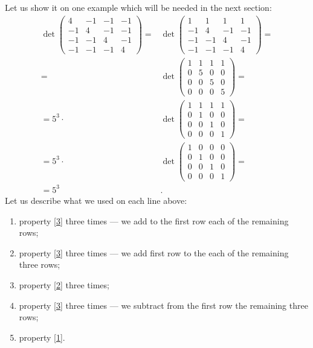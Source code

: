 Let us show it on one example which will be needed in the next section:
\begin{align*}
\det\left(
\begin{matrix}
4&-1&-1&-1
\\
-1&4&-1&-1
\\
-1&-1&4&-1
\\
-1&-1&-1&4
\end{matrix}
\right)
=
&\det\left(
\begin{matrix}
1&1&1&1
\\
-1&4&-1&-1
\\
-1&-1&4&-1
\\
-1&-1&-1&4
\end{matrix}
\right) 
=
\\
=
&\det\left(
\begin{matrix}
1&1&1&1
\\
0&5&0&0
\\
0&0&5&0
\\
0&0&0&5
\end{matrix}
\right)
=
\\
=
5^3\cdot
&\det\left(
\begin{matrix}
1&1&1&1
\\
0&1&0&0
\\
0&0&1&0
\\
0&0&0&1
\end{matrix}
\right)=
\\
=
5^3\cdot&\det\left(
\begin{matrix}
1&0&0&0
\\
0&1&0&0
\\
0&0&1&0
\\
0&0&0&1
\end{matrix}
\right)=
\\
=5^3&.
\end{align*}
Let us describe what we used on each line above:
\begin{enumerate}
\item property \ref{3} three times --- we add to the first row each of the remaining rows;
\item property \ref{3} three times --- we add first row to the each of the remaining three rows;
\item property \ref{2} three times;
\item property \ref{3} three times --- we subtract from the first row the remaining three rows;
\item property \ref{1}.
\end{enumerate}


